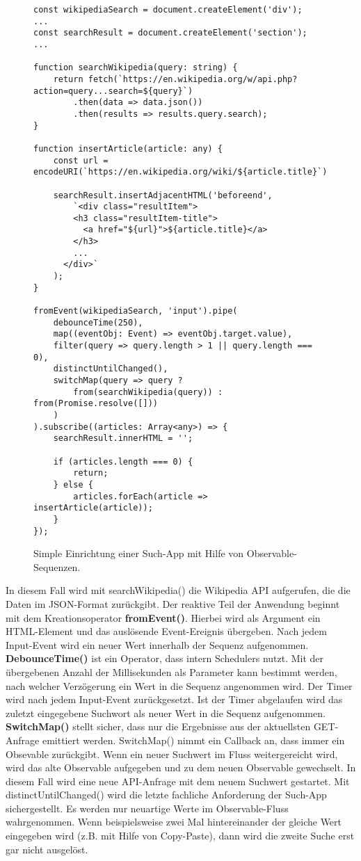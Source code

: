 \begin{figure}[H]
\begin{lstlisting}[basicstyle=\small]
const wikipediaSearch = document.createElement('div');
...
const searchResult = document.createElement('section');
...

function searchWikipedia(query: string) {
    return fetch(`https://en.wikipedia.org/w/api.php?action=query...search=${query}`)
        .then(data => data.json())
        .then(results => results.query.search);
}

function insertArticle(article: any) {
    const url = encodeURI(`https://en.wikipedia.org/wiki/${article.title}`);

    searchResult.insertAdjacentHTML('beforeend',
        `<div class="resultItem">
        <h3 class="resultItem-title">
          <a href="${url}">${article.title}</a>
        </h3>
        ...
      </div>`
    );
}

fromEvent(wikipediaSearch, 'input').pipe(
    debounceTime(250),
    map((eventObj: Event) => eventObj.target.value),
    filter(query => query.length > 1 || query.length === 0),
    distinctUntilChanged(),
    switchMap(query => query ?
        from(searchWikipedia(query)) : from(Promise.resolve([]))
    )
).subscribe((articles: Array<any>) => {
    searchResult.innerHTML = '';

    if (articles.length === 0) {
        return;
    } else {
        articles.forEach(article => insertArticle(article));
    }
});
\end{lstlisting}
\caption{Simple Einrichtung einer Such-App mit Hilfe von Observable-Sequenzen.}
\end{figure}

\noindent
In diesem Fall wird mit searchWikipedia() die Wikipedia API aufgerufen, die die Daten im JSON-Format zurückgibt. Der reaktive Teil der Anwendung beginnt mit dem Kreationsoperator \textbf{fromEvent()}. Hierbei wird als Argument ein HTML-Element und das auslösende Event-Ereignis übergeben. Nach jedem Input-Event wird ein neuer Wert innerhalb der Sequenz aufgenommen. \textbf{DebounceTime()} ist ein Operator, dass intern Schedulers nutzt. Mit der übergebenen Anzahl der Millisekunden als Parameter kann bestimmt werden, nach welcher Verzögerung ein Wert in die Sequenz angenommen wird. Der Timer wird nach jedem Input-Event zurückgesetzt. Ist der Timer abgelaufen wird das zuletzt eingegebene Suchwort als neuer Wert in die Sequenz aufgenommen. \textbf{SwitchMap()} stellt sicher, dass nur die Ergebnisse aus der aktuellsten GET-Anfrage emittiert werden. SwitchMap() nimmt ein Callback an, dass immer ein Obsevable zurückgibt. Wenn ein neuer Suchwert im Fluss weitergereicht wird, wird das alte Observable aufgegeben und zu dem neuen Observable gewechselt. In diesem Fall wird eine neue API-Anfrage mit dem neuem Suchwert gestartet. Mit distinctUntilChanged() wird die letzte fachliche Anforderung der Such-App sichergestellt. Es werden nur neuartige Werte im Observable-Fluss wahrgenommen\cite{distinctUntilChanged-bib}. Wenn beispielsweise zwei Mal hintereinander der gleiche Wert eingegeben wird (z.B. mit Hilfe von Copy-Paste), dann wird die zweite Suche erst gar nicht ausgelöst.\\

